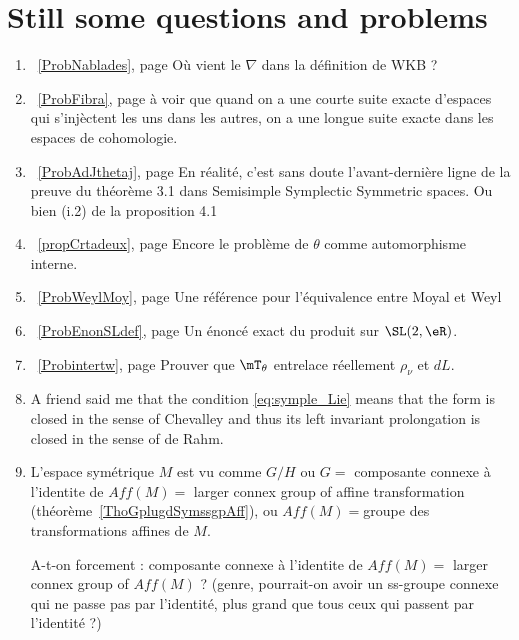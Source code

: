 
\newcommand{\refprob}[1]{\ref{#1}, page \pageref{#1}}

\section{Still some questions and problems}


\begin{enumerate}
\item~\refprob{ProbNablades} Où vient le $\nabla$ dans la définition de WKB ?
 \item~\refprob{ProbFibra} à voir que quand on a une courte suite exacte d'espaces qui s'injèctent les uns dans les autres, on a une longue suite exacte dans les espaces de cohomologie.
\item ~\refprob{ProbAdJthetaj} En réalité, c'est sans doute l'avant-dernière ligne de la preuve du théorème 3.1 dans Semisimple Symplectic Symmetric spaces. Ou bien (i.2) de la proposition 4.1
\item~\refprob{propCrtadeux} Encore le problème de $\theta$ comme automorphisme interne.

\item~\refprob{ProbWeylMoy} Une référence pour l'équivalence entre Moyal et Weyl
\item~\refprob{ProbEnonSLdef} Un énoncé exact du produit sur $\SL(2,\eR)$.
\item~\refprob{Probintertw} Prouver que $\mT_{\theta}$ entrelace réellement $\rho_{\nu}$ et $dL$.

    \item
        A friend said me that the condition \eqref{eq:symple_Lie} means that the form is closed in the sense of Chevalley and thus its left invariant prolongation is closed in the sense of de Rahm.
    \item

	L’espace symétrique $M$ est vu comme $G/H$ ou $G =$ composante connexe à l’identite de $Aff(M) =$ larger connex group of affine transformation (théorème~\ref{ThoGplugdSymssgpAff}), ou $Aff(M)=$groupe des transformations affines de $M$.

A-t-on forcement : composante connexe à l’identite de $Aff(M)  =$ larger connex group of $Aff(M)$ ?
(genre, pourrait-on avoir un ss-groupe connexe qui ne passe pas par l’identité, plus grand que tous ceux qui passent par l’identité ?)


\end{enumerate}
